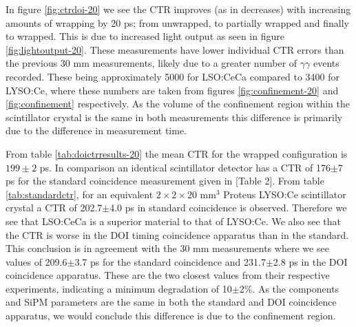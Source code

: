 In figure \ref{fig:ctrdoi-20} we see the CTR improves (as in decreases) with increasing amounts of wrapping by 20 ps; from unwrapped, to partially wrapped and finally to wrapped. This is due to increased light output as seen in figure \ref{fig:lightoutput-20}. These measurements have lower individual CTR errors than the previous 30 mm measurements, likely due to a greater number of $\gamma\gamma$ events recorded. These being approximately 5000 for LSO:CeCa compared to 3400 for LYSO:Ce, where these numbers are taken from figures \ref{fig:confinement-20} and \ref{fig:confinement} respectively. As the volume of the confinement region within the scintillator crystal is the same in both measurements this difference is primarily due to the difference in measurement time. 

From table \ref{tab:doictrresults-20} the mean CTR for the wrapped configuration is $199\pm2$ ps. In comparison an identical scintillator detector has a CTR of 176$\pm$7 ps for the standard coincidence measurement given in [Table 2]\cite{uffray_Jarron_Meyer_Lecoq_2014}. From table \ref{tab:standardctr}, for an equivalent $2\times2\times20$ mm$^3$ Proteus LYSO:Ce scintillator crystal a CTR of 202.7$\pm$4.0 ps in standard coincidence is observed. Therefore we see that LSO:CeCa is a superior material to that of LYSO:Ce. We also see that the CTR is worse in the DOI timing coincidence apparatus than in the standard. This conclusion is in agreement with the 30 mm measurements where we see values of 209.6$\pm$3.7 ps for the standard coincidence and 231.7$\pm$2.8 ps in the DOI coincidence apparatus. These are the two closest values from their respective experiments, indicating a minimum degradation of 10$\pm$2\%. As the components and SiPM parameters are the same in both the standard and DOI coincidence apparatus, we would conclude this difference is due to the confinement region.